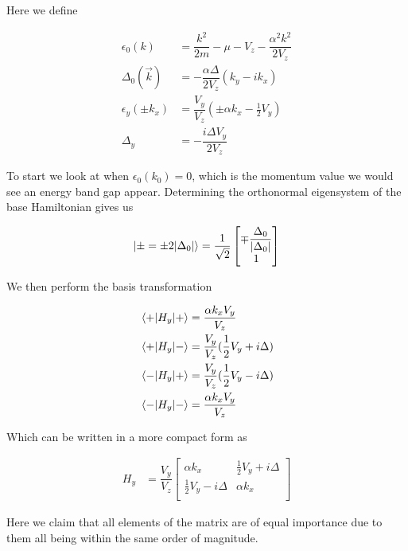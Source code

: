 Here we define

\begin{align}
  \epsilon_0(k) &= \dfrac{k^2}{2m}-\mu-V_z-\dfrac{\alpha^2k^2}{2V_z} \\
  \Delta_0(\vec{k}) &= -\dfrac{\alpha\Delta}{2V_z}(k_y-ik_x) \\
  \epsilon_y(\pm k_x) &= \dfrac{V_y}{V_z}(\pm\alpha k_x -\frac{1}{2}V_y) \\
  \Delta_y &= -\dfrac{i\Delta V_y}{2V_z}
\end{align}

To start we look at when $\epsilon_0(k_0) = 0$, which is the momentum value we would see an energy band gap appear. Determining the orthonormal eigensystem of the base Hamiltonian gives us

\begin{align}
  \ket{\pm =\pm 2|\Delta_0|} = \dfrac{1}{\sqrt{2}}
    \begin{bmatrix}
      \mp\dfrac{\Delta_0}{|\Delta_0|} \\
      1
    \end{bmatrix}
\end{align}

We then perform the basis transformation

\begin{align}
  \matrixelement{+}{H_y}{+} &= \dfrac{\alpha k_x V_y}{V_z} \\
  \matrixelement{+}{H_y}{-} &= \dfrac{V_y}{V_z}(\frac{1}{2}V_y+i\Delta) \\
  \matrixelement{-}{H_y}{+} &= \dfrac{V_y}{V_z}(\frac{1}{2}V_y-i\Delta) \\
  \matrixelement{-}{H_y}{-} &= \dfrac{\alpha k_x V_y}{V_z}
\end{align}

Which can be written in a more compact form as

\begin{align}
  H_y &= \dfrac{V_y}{V_z}
  \begin{bmatrix}
    \alpha k_x & \frac{1}{2}V_y+i\Delta \\
    \frac{1}{2}V_y-i\Delta & \alpha k_x \\
  \end{bmatrix}
\end{align}

Here we claim that all elements of the matrix are of equal importance due to them all being within the same order of magnitude.
